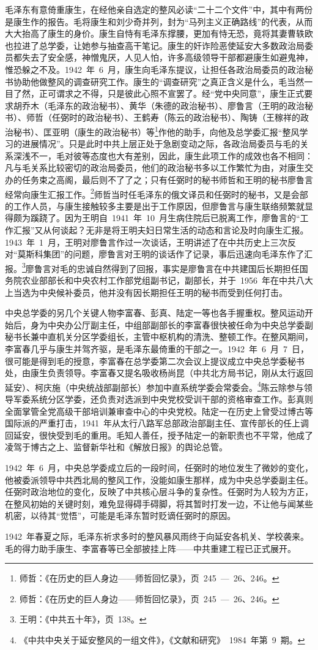 毛泽东有意倚重康生，在经他亲自选定的整风必读“二十二个文件”中，其中有两份是康生作的报告。毛将康生和刘少奇并列，封为“马列主义正确路线”的代表，从而大大抬高了康生的身价。康生自恃有毛泽东撑腰，更加有恃无恐，竟将其妻曹轶欧也拉进了总学委，让她参与抽查高干笔记。康生的奸诈险恶使延安大多数政治局委员都失去了安全感，神憎鬼厌，人见人怕，许多高级领导干部都避康生如避鬼神，惟恐躲之不及。1942~年~6~月，康生向毛泽东提议，让担任各政治局委员的政治秘书协助他做整风的调查研究工作。康生的“调查研究”之真正含义是什么，毛当然一目了然，正可谓求之不得，只是彼此心照不宣罢了。经“党中央同意”，康生正式要求胡乔木（毛泽东的政治秘书）、黄华（朱德的政治秘书）、廖鲁言（王明的政治秘书）、师哲（任弼时的政治秘书）、王鹤寿（陈云的政治秘书）、陶铸（王稼祥的政治秘书）、匡亚明（康生的政治秘书）等\footnote{师哲：《在历史的巨人身边——师哲回忆录》，页~245~—~26、246。}作他的助手，向他及总学委汇报“整风学习的进展情况”。只是此时中共上层正处于急剧变动之际，各政治局委员与毛的关系深浅不一，毛对彼等态度也大有差别，因此，康生此项工作的成效也各不相同：凡与毛关系比较密切的政治局委员，他们的政治秘书多以工作繁忙为由，对康生交办的任务束之高阁，最后则不了了之；只有任弼时的秘书师哲和王明的秘书廖鲁言经常向康生汇报工作。\footnote{师哲：《在历史的巨人身边——师哲回忆录》，页~245~—~26、246。}师哲当时任毛泽东的俄文译员和任弼时的秘书，又是会部的工作人员，与康生接触较多主要是出于工作原因，但廖鲁言与康生联络频繁就显得颇为蹊跷了。因为王明自~1941~年~10~月生病住院后已脱离工作，廖鲁言的“工作汇报”又从何谈起？无非是将王明夫妇日常生活的动态和言论及时向康生汇报。1943~年~1~月，王明对廖鲁言作过一次谈话，王明讲述了在中共历史上三次反对“莫斯科集团”的问题，廖鲁言对王明的谈话作了记录，事后迅速向毛泽东作了汇报。\footnote{王明：《中共五十年》，页~138。}廖鲁言对毛的忠诚自然得到了回报，事实是廖鲁言在中共建国后长期担任国务院农业部部长和中央农村工作部党组副书记，副部长，并于~1956~年在中共八大上当选为中央候补委员，他并没有因长期担任王明的秘书而受到任何打击。

中央总学委的另几个关键人物李富春、彭真、陆定一等也各手握重权。整风运动开始后，身为中央办公厅副主任，中组部副部长的李富春很快被任命为中央总学委副秘书长兼中直机关分区学委组长，主管中枢机构的清洗、整顿工作。在整风期间，李富春几乎与康生并驾齐驱，是毛泽东最倚重的干部之一。1942~年~6~月~7~日，很可能是得到毛的授意，李富春在总学委第二次会议上提议成立中央总学委秘书处，由康生负责领导。李富春又提名吸收杨尚昆（中共北方局书记，刚从太行返回延安）、柯庆施（中央统战部副部长）参加中直系统学委会常委会。\footnote{《中共中央关于延安整风的一组文件》，《文献和研究》~1984~年第~9~期。}陈云除参与领导军委系统分区学委，还负责对选派到中央党校受训干部的资格审查工作。彭真则全面掌管全党高级干部培训兼审查中心的中央党校。陆定一在历史上曾受过博古等国际派的严重打击，1941~年从太行八路军总部政治部副主任、宣传部长的任上调回延安，很快受到毛的重用。毛知人善任，授予陆定一的新职责也不平常，他成了凌驾于博古之上、监督新华社和《解放日报》的舆论总管。

1942~年~6~月，中央总学委成立后的一段时间，任弼时的地位发生了微妙的变化，他被委派领导中共西北局的整风工作，没能如康生那样，成为中央总学委副主任。任弼时政治地位的变化，反映了中共核心层斗争的复杂性。任弼时为人较为方正，在整风初始的关键时刻，难免显得碍手碍脚，将其暂时打发一边，不让他与闻某些机密，以待其“觉悟”，可能是毛泽东暂时贬谪任弼时的原因。

1942~年春夏之际，毛泽东祈求多时的整风暴风雨终于向延安各机关、学校袭来。毛的得力助手康生、李富春等已全部披挂上阵——中共重建工程已正式展开。